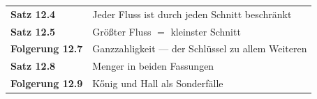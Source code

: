 \begin{merksatz}
\begin{center}
\renewcommand{\arraystretch}{1.5}
\begin{tabular}{@{}P{3.0cm}P{5.6cm}@{}}
\toprule
\textbf{Satz 12.4} & Jeder Fluss ist durch jeden Schnitt beschränkt\\
\textbf{Satz 12.5} & Größter Fluss $=$ kleinster Schnitt\\
\textbf{Folgerung 12.7} & Ganzzahligkeit --- der Schlüssel zu allem Weiteren\\
\textbf{Satz 12.8} & Menger in beiden Fassungen\\
\textbf{Folgerung 12.9} & Kőnig und Hall als Sonderfälle\\
\bottomrule
\end{tabular}
\end{center}

\begin{center}
\begin{minipage}{0.88\textwidth}
\end{minipage}
\end{center}
\end{merksatz}
